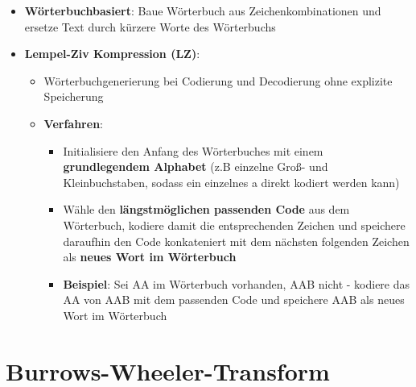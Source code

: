 \documentclass[10pt,a4paper]{article}
\begin{document}
	\begin{itemize}
		\item \textbf{Wörterbuchbasiert}: Baue Wörterbuch aus Zeichenkombinationen und ersetze Text durch kürzere Worte des Wörterbuchs
		\item \textbf{Lempel-Ziv Kompression (LZ)}:
		\begin{itemize}
			\item Wörterbuchgenerierung bei Codierung und Decodierung ohne explizite Speicherung
			\item \textbf{Verfahren}:
			\begin{itemize}
				\item Initialisiere den Anfang des Wörterbuches mit einem \textbf{grundlegendem Alphabet} (z.B einzelne Groß- und Kleinbuchstaben, sodass ein einzelnes a direkt kodiert werden kann)
			 	\item Wähle den \textbf{längstmöglichen passenden Code} aus dem Wörterbuch, kodiere damit die entsprechenden Zeichen und speichere daraufhin den Code konkateniert mit dem nächsten folgenden Zeichen als \textbf{neues Wort im Wörterbuch}
			 	\item \textbf{Beispiel}: Sei AA im Wörterbuch vorhanden, AAB nicht - kodiere das AA von AAB mit dem passenden Code und speichere AAB als neues Wort im Wörterbuch
			 \end{itemize} 
		\end{itemize}
	\end{itemize}

	\newpage
	\section{Burrows-Wheeler-Transform}
	\label{bwt:sec:burrows_wheeler_transform}
	
\end{document}
